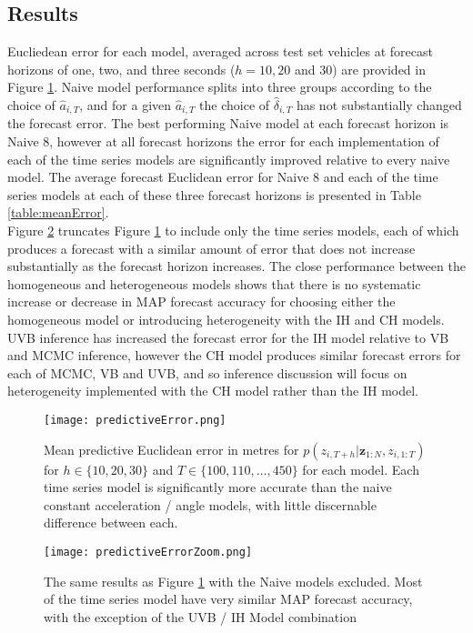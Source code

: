 \documentclass[12pt,a4paper]{article}\usepackage[]{graphicx}\usepackage[]{color}
\begin{document}
\subsection{Results}
\label{subsec:Results}

Eucliedean error for each model, averaged across test set vehicles at forecast horizons of one, two, and three seconds ($h = 10, 20$ and $30$) are provided in Figure \ref{fig:PredError}. Naive model performance splits into three groups according to the choice of $\hat{a}_{i, T}$, and for a given $\hat{a}_{i, T}$ the choice of $\hat{\delta}_{i, T}$ has not substantially changed the forecast error. The best performing Naive model at each forecast horizon is Naive 8, however at all forecast horizons the error for each implementation of each of the time series models are significantly improved relative to every naive model. The average forecast Euclidean error for Naive 8 and each of the time series models at each of these three forecast horizons is presented in Table \ref{table:meanError}.
\\

Figure \ref{fig:PredErrorZ} truncates Figure \ref{fig:PredError} to include only the time series models, each of which produces a forecast with a similar amount of error that does not increase substantially as the forecast horizon increases. The close performance between the homogeneous and heterogeneous models shows that there is no systematic increase or decrease in MAP forecast accuracy for choosing either the homogeneous model or introducing heterogeneity with the IH and CH models. UVB inference has increased the forecast error for the IH model relative to VB and MCMC inference, however the CH model produces similar forecast errors for each of MCMC, VB and UVB, and so inference discussion will focus on heterogeneity implemented with the CH model rather than the IH model. 
\\

\begin{figure}[ht]
\centering
\texttt{[image: predictiveError.png]}
\caption{Mean predictive Euclidean error in metres for $p(z_{i, T+h} | \textbf{z}_{1:N}, z_{i, 1:T})$ for $h \in \{10, 20, 30\}$ and $T \in \{100, 110, \dots, 450\}$ for each model. Each time series model is significantly more accurate than the naive constant acceleration / angle models, with little discernable difference between each.}
\label{fig:PredError}
\end{figure}

\begin{figure}[ht]
\centering
\texttt{[image: predictiveErrorZoom.png]}
\caption{The same results as Figure \ref{fig:PredError} with the Naive models excluded. Most of the time series model have very similar MAP forecast accuracy, with the exception of the UVB / IH Model combination}
\label{fig:PredErrorZ}
\end{figure}
\end{document}
